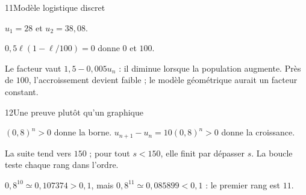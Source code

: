 \begin{corrige}{11}{Modèle logistique discret}
\begin{questions}
\item $u_1=28$ et $u_2=38{,}08$.
\item $0{,}5\ell(1-\ell/100)=0$ donne $0$ et $100$.
\item Le facteur vaut $1{,}5-0{,}005u_n$ : il diminue lorsque la population augmente. Près de $100$, l’accroissement devient faible ; le modèle géométrique aurait un facteur constant.
\end{questions}
\end{corrige}
\begin{corrige}{12}{Une preuve plutôt qu’un graphique}
\begin{questions}
\item $(0{,}8)^n>0$ donne la borne. $u_{n+1}-u_n=10(0{,}8)^n>0$ donne la croissance.
\item La suite tend vers $150$ ; pour tout $s<150$, elle finit par dépasser $s$. La boucle teste chaque rang dans l’ordre.
\item $0{,}8^{10}\simeq0{,}107374>0{,}1$, mais $0{,}8^{11}\simeq0{,}085899<0{,}1$ : le premier rang est $11$.
\end{questions}
\end{corrige}
